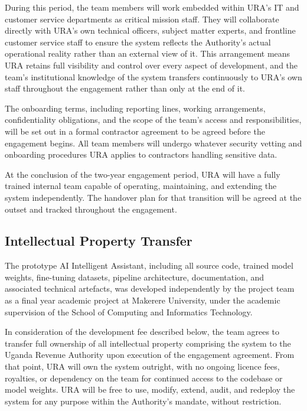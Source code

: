 \documentclass[11pt,a4paper]{article}
\begin{document}
During this period, the team members will work embedded within URA's IT and customer service departments as critical mission staff. They will collaborate directly with URA's own technical officers, subject matter experts, and frontline customer service staff to ensure the system reflects the Authority's actual operational reality rather than an external view of it. This arrangement means URA retains full visibility and control over every aspect of development, and the team's institutional knowledge of the system transfers continuously to URA's own staff throughout the engagement rather than only at the end of it.

The onboarding terms, including reporting lines, working arrangements, confidentiality obligations, and the scope of the team's access and responsibilities, will be set out in a formal contractor agreement to be agreed before the engagement begins. All team members will undergo whatever security vetting and onboarding procedures URA applies to contractors handling sensitive data.

At the conclusion of the two-year engagement period, URA will have a fully trained internal team capable of operating, maintaining, and extending the system independently. The handover plan for that transition will be agreed at the outset and tracked throughout the engagement.

\subsection{Intellectual Property Transfer}

The prototype AI Intelligent Assistant, including all source code, trained model weights, fine-tuning datasets, pipeline architecture, documentation, and associated technical artefacts, was developed independently by the project team as a final year academic project at Makerere University, under the academic supervision of the School of Computing and Informatics Technology.

In consideration of the development fee described below, the team agrees to transfer full ownership of all intellectual property comprising the system to the Uganda Revenue Authority upon execution of the engagement agreement. From that point, URA will own the system outright, with no ongoing licence fees, royalties, or dependency on the team for continued access to the codebase or model weights. URA will be free to use, modify, extend, audit, and redeploy the system for any purpose within the Authority's mandate, without restriction.
\end{document}
